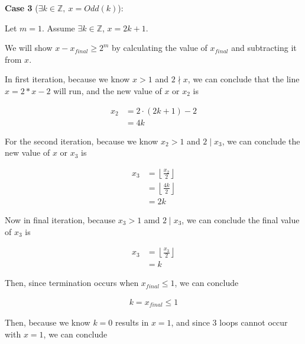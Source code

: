 \documentclass[12pt]{article}
\begin{document}
\begin{enumerate}[a.]
    \textbf{Case 3} ($\exists k \in \mathbb{Z},\:x = Odd(k)$):

    \bigskip

    Let $m = 1$. Assume $\exists k \in \mathbb{Z}$, $x = 2k + 1$.

    \bigskip

    We will show $x - x_{final} \geq 2^m$ by calculating the value of $x_{final}$
    and subtracting it from $x$.

    \bigskip

    In first iteration, because we know $x > 1$ and $2 \nmid x$, we can conclude
    that the line $x = 2 * x - 2$ will run, and the new value of $x$ or $x_2$ is

    \begin{align}
        x_2 &= 2 \cdot (2k + 1) - 2 \\
        &= 4k
    \end{align}

    \bigskip

    For the second iteration, because we know $x_2 > 1$ and $2 \mid x_3$, we can
    conclude the new value of $x$ or $x_3$ is

    \begin{align}
        x_3 &= \left\lfloor \frac{x_2}{2} \right\rfloor\\
        &= \left\lfloor \frac{4k}{2} \right\rfloor\\
        &= 2k
    \end{align}

    \bigskip

    Now in final iteration, because $x_3 > 1$ amd $2 \mid x_3$, we can conclude
    the final value of $x_3$ is

    \begin{align}
        x_3 &= \left\lfloor \frac{x_3}{2} \right\rfloor\\
        &= k
    \end{align}

    \bigskip

    Then, since termination occurs when $x_{final} \leq 1$, we can conclude

    \begin{align}
        k = x_{final} \leq 1
    \end{align}

    \bigskip

    Then, because we know $k = 0$ results in $x = 1$, and since 3 loops cannot
    occur with $x = 1$, we can conclude


\end{enumerate}
\end{document}
